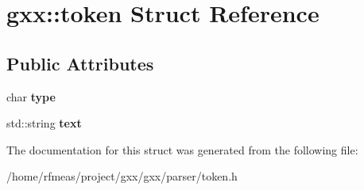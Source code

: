 \hypertarget{structgxx_1_1token}{}\section{gxx\+:\+:token Struct Reference}
\label{structgxx_1_1token}
\subsection*{Public Attributes}
\begin{DoxyCompactItemize}
\item 
char {\bfseries type}\hypertarget{structgxx_1_1token_a202c07f3dabb1e85e07160bda9dd7279}{}\label{structgxx_1_1token_a202c07f3dabb1e85e07160bda9dd7279}

\item 
std\+::string {\bfseries text}\hypertarget{structgxx_1_1token_adbde5d92ae3b4d4b4d01973728663b2c}{}\label{structgxx_1_1token_adbde5d92ae3b4d4b4d01973728663b2c}

\end{DoxyCompactItemize}


The documentation for this struct was generated from the following file\+:\begin{DoxyCompactItemize}
\item 
/home/rfmeas/project/gxx/gxx/parser/token.\+h\end{DoxyCompactItemize}
